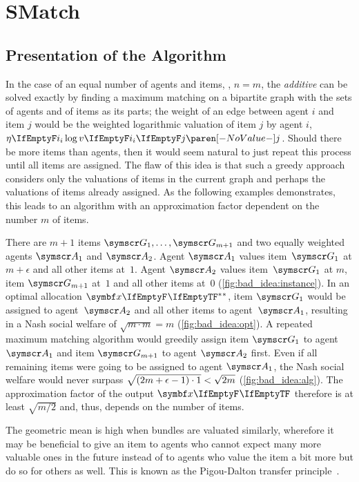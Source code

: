 \section{SMatch}
\label{sec:smatch}

\subsection{Presentation of the Algorithm}
\label{subsec:smatch:presentation}

In the case of an equal number of agents and items, \ie, \(n = m\), the \emph{additive} \NSW{} can be solved exactly by finding a maximum matching on a bipartite graph with the sets of agents and of items as its parts;
the weight of an edge between agent \(i\) and item \(j\) would be the weighted logarithmic valuation of item \(j\) by agent \(i\), \ie{} \(\weight \log \valuations[j]\).
Should there be more items than agents, then it would seem natural to just repeat this process until all items are assigned.
The flaw of this idea is that such a greedy approach considers only the valuations of items in the current graph and perhaps the valuations of items already assigned.
As the following examples demonstrates, this leads to an algorithm with an approximation factor dependent on the number \(m\) of items.
\begin{example}
	\label{ex:bad_idea}
	There are \(m+1\) items \(\goods_{1}, \dots, \goods_{m+1}\) and two equally weighted agents \(\agents_{1}\) and \(\agents_{2}\).
	Agent \(\agents_{1}\) values item~\(\goods_{1}\) at \(m + \epsilon\) and all other items at~\(1\).
	Agent \(\agents_{2}\) values item~\(\goods_{1}\) at \(m\), item \(\goods_{m+1}\) at~\(1\) and all other items at~\(0\) (\cref{fig:bad_idea:instance}).
	In an optimal allocation \(\alloc*[][]\), item \(\goods_{1}\) would be assigned to agent~\(\agents_{2}\) and all other items to agent~\(\agents_{1}\), resulting in a Nash social welfare of \(\sqrt{m \cdot m} = m\) (\cref{fig:bad_idea:opt}).
	A repeated maximum matching algorithm would greedily assign item \(\goods_{1}\) to agent \(\agents_{1}\) and item \(\goods_{m+1}\) to agent \(\agents_{2}\) first.
	Even if all remaining items were going to be assigned to agent \(\agents_{1}\), the Nash social welfare would never surpass \(\smash{\sqrt{(2m + \epsilon - 1) \cdot 1}} < \sqrt{2m}\) (\cref{fig:bad_idea:alg}).
	The approximation factor of the output \(\alloc[][]\) therefore is at least \(\sqrt{m/2}\) and, thus, depends on the number of items.
\end{example}
The geometric mean is high when bundles are valuated similarly, wherefore it may be beneficial to give an item to agents who cannot expect many more valuable ones in the future instead of to agents who value the item a bit more but do so for others as well.
This is known as the Pigou-Dalton transfer principle~\cite{sublin_approx_algo_for_nsw_with_xos_valuations}.

